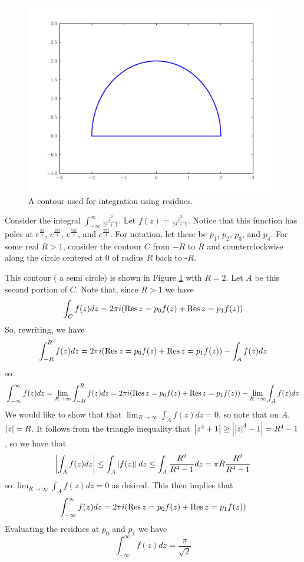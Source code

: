 \begin{figure}
\includegraphics[width=\textwidth]{contour1.pdf}
\caption{A contour used for integration using residues.}
\label{complexint:c1}
\end{figure}

Consider the integral $\int_{-\infty}^{\infty}\frac{z^2}{z^4+1}$. Let $f(z)=\frac{z^2}{z^4+1}$.
Notice that this function has poles at $e^{\frac{\pi i}{4}}$, $e^{\frac{3\pi i}{4}}$, $e^{\frac{5\pi i}{4}}$, and $e^{\frac{7\pi i}{4}}$.
For notation, let these be $p_1$, $p_2$, $p_3$, and $p_4$.
For some real $R>1$, consider the contour $C$ from $-R$ to $R$ and counterclockwise along the circle centered at $0$ of radius $R$ back to -$R$.

This contour ( a semi circle) is shown in Figure \ref{complexint:c1} with $R = 2$.
Let $A$ be this second portion of $C$.
Note that, since $R>1$ we have
\begin{equation*}
\int_C f(z)dz = 2\pi i (\operatorname{Res}{z=p_0} f(z) +\operatorname{Res}{z=p_1} f(z))
\end{equation*}
So, rewriting, we have
\begin{equation*}
\int_{-R}^R f(z) dz = 2\pi i (\operatorname{Res}{z=p_0} f(z) +\operatorname{Res}{z=p_1} f(z)) - \int_A f(z) dz
\end{equation*}
so
\begin{equation*}
\int_{-\infty}^{\infty} f(z) dz = \lim_{R\to \infty} \int_{-R}^R f(z) dz = 2\pi i (\operatorname{Res}{z=p_0} f(z) +\operatorname{Res}{z=p_1} f(z)) - \lim_{R\to \infty} \int_A f(z) dz
\end{equation*}
We would like to show that that $\lim_{R\to\infty} \int_A f(z) dz = 0$, so note that on $A$, $\left\lvert z\right\rvert=R$.
It follows from the triangle inequality that $\left\lvert z^4+1\right\rvert\geq \left\lvert\left\lvert z\right\rvert^4-1\right\rvert = R^4 -1$, so we have that 
$$\left\lvert\int_A f(z) dz\right\rvert\leq \int_A \left\lvert f(z)\right\rvert dz \leq \int_A \frac{R^2}{R^4 -1}dz = \pi R \frac{R^2}{R^4-1}$$
so $\lim_{R\to\infty} \int_A f(z) dz = 0$ as desired.
This then implies that 
\begin{equation*}
 \int_{-\infty}^{\infty} f(z) dz = 2\pi i (\operatorname{Res}{z=p_0} f(z) +\operatorname{Res}{z=p_1} f(z))
\end{equation*}
Evaluating the residues at $p_0$ and $p_1$ we have
$$\int_{-\infty}^{\infty} f(z) dz = \frac{\pi}{\sqrt{2}}$$

